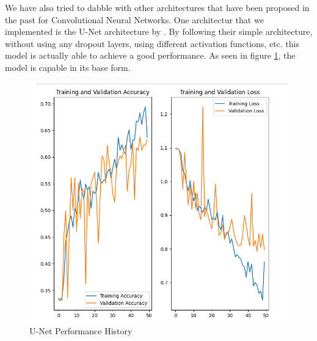 We have also tried to dabble with other architectures that have been proposed in the past for Convolutional Neural Networks. One architectur that we implemented is the U-Net architecture by \cite{ronneberger_u-net:_2015}. By following their simple architecture, without using any dropout layers, using different activation functions, etc. this model is actually able to achieve a good performance. As seen in figure \ref{unet}, the model is capable in its base form.

\begin{figure}[H]
  \centering
  \includegraphics[width=0.8\linewidth]{figures/u_net.png}
  \caption{U-Net Performance History}
  \label{unet}
\end{figure}
